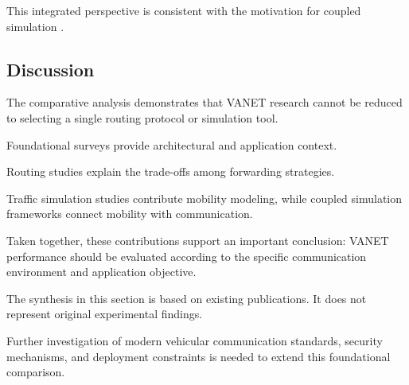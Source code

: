 This integrated
perspective is
consistent with
the motivation
for coupled
simulation
\cite{Sommer2011}.

\subsection{Discussion}

The comparative
analysis demonstrates
that VANET research
cannot be reduced
to selecting a
single routing
protocol or
simulation tool.

Foundational surveys
provide architectural
and application
context.

Routing studies
explain the
trade-offs among
forwarding strategies.

Traffic simulation
studies contribute
mobility modeling,
while coupled
simulation frameworks
connect mobility
with communication.

Taken together,
these contributions
support an important
conclusion: VANET
performance should
be evaluated
according to the
specific communication
environment and
application objective.

The synthesis in
this section is
based on existing
publications.
It does not
represent original
experimental findings.

Further investigation
of modern vehicular
communication standards,
security mechanisms,
and deployment
constraints is
needed to extend
this foundational
comparison.
